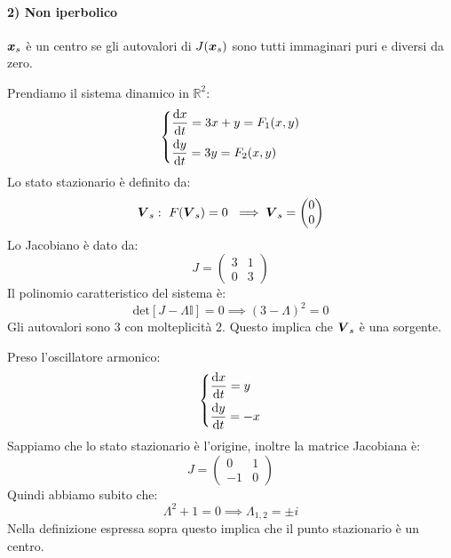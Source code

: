 \paragraph{2) Non iperbolico}%
\begin{defn}[Centro]
    $\boldsymbol{x}_s$ è un centro se gli autovalori di $J(\boldsymbol{x}_s)$ sono tutti immaginari puri e diversi da zero.
\end{defn}
\noindent
\begin{exmp}[1]
    Prendiamo il sistema dinamico in $\mathbb{R}^2$:
    \[\begin{dcases}
	\frac{\text{d} x}{\text{d} t} = 3x + y = F_1(x, y)\\
	\frac{\text{d} y}{\text{d} t} = 3y = F_2(x, y)
    \end{dcases}\] 
    Lo stato stazionario è definito da:
    \[
	\vect{V}_s: \ F(\vect{V}_s) = 0 \ \implies  \vect{V}_s = \begin{pmatrix} 0 \\ 0 \end{pmatrix} 
    \] 
    Lo Jacobiano è dato da:
    \[
	J = \begin{pmatrix} 3 & 1 \\ 0 & 3 \end{pmatrix} 
    \] 
    Il polinomio caratteristico del sistema è:
    \[
	\text{det}\left[J-\Lambda\mathbb{I}\right] = 0 \implies  (3-\Lambda)^2 = 0
    \] 
    Gli autovalori sono $3$ con molteplicità 2. Questo implica che $\boldsymbol{V}_s$ è una sorgente.
\end{exmp}
\noindent
\begin{exmp}
    Preso l'oscillatore armonico:
   \[\begin{dcases}
       \frac{\text{d} x}{\text{d} t} = y\\
       \frac{\text{d} y}{\text{d} t} = -x
   \end{dcases}\]  
   Sappiamo che lo stato stazionario è l'origine, inoltre la matrice Jacobiana è:
   \[
       J = \begin{pmatrix} 0 & 1 \\ -1 & 0 \end{pmatrix} 
   \] 
   Quindi abbiamo subito che:
   \[
       \Lambda^2 + 1 = 0 \implies  \Lambda_{1, 2} = \pm i
   \] 
   Nella definizione espressa sopra questo implica che il punto stazionario è un centro.
\end{exmp}
\noindent
